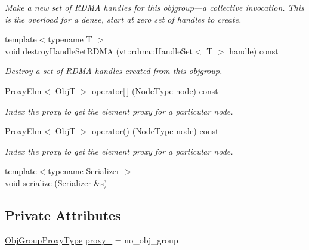 \begin{DoxyCompactItemize}
\begin{DoxyCompactList}\small\item\em Make a new set of R\+D\+MA handles for this objgroup---a collective invocation. This is the overload for a dense, start at zero set of handles to create. \end{DoxyCompactList}\item 
{\footnotesize template$<$typename T $>$ }\\void \hyperlink{structvt_1_1objgroup_1_1proxy_1_1_proxy_a9211f7a2459cfcb28f8b90dbdc77c8bc}{destroy\+Handle\+Set\+R\+D\+MA} (\hyperlink{structvt_1_1rdma_1_1_handle_set}{vt\+::rdma\+::\+Handle\+Set}$<$ T $>$ handle) const
\begin{DoxyCompactList}\small\item\em Destroy a set of R\+D\+MA handles created from this objgroup. \end{DoxyCompactList}\item 
\hyperlink{structvt_1_1objgroup_1_1proxy_1_1_proxy_elm}{Proxy\+Elm}$<$ ObjT $>$ \hyperlink{structvt_1_1objgroup_1_1proxy_1_1_proxy_a00a267a8730fe2547776ff0136ea3895}{operator\mbox{[}$\,$\mbox{]}} (\hyperlink{namespacevt_a866da9d0efc19c0a1ce79e9e492f47e2}{Node\+Type} node) const
\begin{DoxyCompactList}\small\item\em Index the proxy to get the element proxy for a particular node. \end{DoxyCompactList}\item 
\hyperlink{structvt_1_1objgroup_1_1proxy_1_1_proxy_elm}{Proxy\+Elm}$<$ ObjT $>$ \hyperlink{structvt_1_1objgroup_1_1proxy_1_1_proxy_ac290e4d37f05dc1183c205a1b9ee44cd}{operator()} (\hyperlink{namespacevt_a866da9d0efc19c0a1ce79e9e492f47e2}{Node\+Type} node) const
\begin{DoxyCompactList}\small\item\em Index the proxy to get the element proxy for a particular node. \end{DoxyCompactList}\item 
{\footnotesize template$<$typename Serializer $>$ }\\void \hyperlink{structvt_1_1objgroup_1_1proxy_1_1_proxy_a06222ad0a05109bfb2d3542b54c2e52a}{serialize} (Serializer \&s)
\end{DoxyCompactItemize}
\subsection*{Private Attributes}
\begin{DoxyCompactItemize}
\item 
\hyperlink{namespacevt_ad7cae989df485fccca57f0792a880a8e}{Obj\+Group\+Proxy\+Type} \hyperlink{structvt_1_1objgroup_1_1proxy_1_1_proxy_a4411a5c2a4719d264060041fd15d9d03}{proxy\+\_\+} = no\+\_\+obj\+\_\+group
\end{DoxyCompactItemize}


